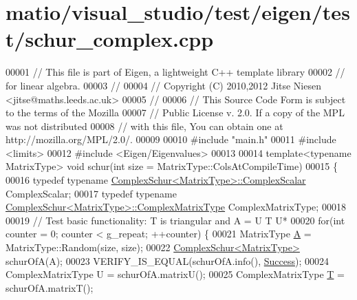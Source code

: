 \hypertarget{matio_2visual__studio_2test_2eigen_2test_2schur__complex_8cpp_source}{}\section{matio/visual\+\_\+studio/test/eigen/test/schur\+\_\+complex.cpp}
\label{matio_2visual__studio_2test_2eigen_2test_2schur__complex_8cpp_source}

\begin{DoxyCode}
00001 \textcolor{comment}{// This file is part of Eigen, a lightweight C++ template library}
00002 \textcolor{comment}{// for linear algebra.}
00003 \textcolor{comment}{//}
00004 \textcolor{comment}{// Copyright (C) 2010,2012 Jitse Niesen <jitse@maths.leeds.ac.uk>}
00005 \textcolor{comment}{//}
00006 \textcolor{comment}{// This Source Code Form is subject to the terms of the Mozilla}
00007 \textcolor{comment}{// Public License v. 2.0. If a copy of the MPL was not distributed}
00008 \textcolor{comment}{// with this file, You can obtain one at http://mozilla.org/MPL/2.0/.}
00009 
00010 \textcolor{preprocessor}{#include "main.h"}
00011 \textcolor{preprocessor}{#include <limits>}
00012 \textcolor{preprocessor}{#include <Eigen/Eigenvalues>}
00013 
00014 \textcolor{keyword}{template}<\textcolor{keyword}{typename} MatrixType> \textcolor{keywordtype}{void} schur(\textcolor{keywordtype}{int} size = MatrixType::ColsAtCompileTime)
00015 \{
00016   \textcolor{keyword}{typedef} \textcolor{keyword}{typename} \hyperlink{group___eigenvalues___module_class_eigen_1_1_complex_schur}{ComplexSchur<MatrixType>::ComplexScalar} 
      ComplexScalar;
00017   \textcolor{keyword}{typedef} \textcolor{keyword}{typename} \hyperlink{group___eigenvalues___module_class_eigen_1_1_complex_schur}{ComplexSchur<MatrixType>::ComplexMatrixType} 
      ComplexMatrixType;
00018 
00019   \textcolor{comment}{// Test basic functionality: T is triangular and A = U T U*}
00020   \textcolor{keywordflow}{for}(\textcolor{keywordtype}{int} counter = 0; counter < g\_repeat; ++counter) \{
00021     MatrixType \hyperlink{group___core___module_class_eigen_1_1_matrix}{A} = MatrixType::Random(size, size);
00022     \hyperlink{group___eigenvalues___module}{ComplexSchur<MatrixType>} schurOfA(A);
00023     VERIFY\_IS\_EQUAL(schurOfA.info(), \hyperlink{group__enums_gga85fad7b87587764e5cf6b513a9e0ee5ea52581b035f4b59c203b8ff999ef5fcea}{Success});
00024     ComplexMatrixType U = schurOfA.matrixU();
00025     ComplexMatrixType \hyperlink{group___sparse_core___module}{T} = schurOfA.matrixT();

\end{DoxyCode}
